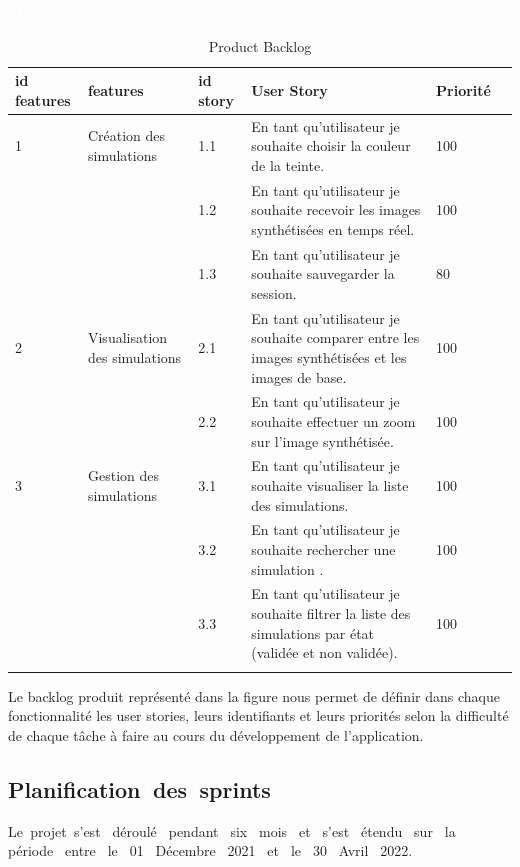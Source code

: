 \begin{center}
\textcolor{white}{J}\textcolor{white}{J}\textcolor{white}{J} \textcolor{white}{J} 

\begin{longtable}[!ht]{|m{1cm}|m{3cm}|m{1cm}|m{7cm}|m{1.5cm}|c|}
\hline
\textbf{id features} & \textbf{features} & \textbf{id story} & \textbf{User Story} & \textbf{Priorité}\\
\hline
1 & Création des simulations & 1.1 & En tant qu’utilisateur je souhaite choisir la couleur de la teinte. & 100\\
\cline{3-5}
&  & 1.2 & En tant qu’utilisateur je souhaite recevoir les images synthétisées en temps  réel. & 100\\
\cline{3-5}
&  & 1.3 & En tant qu’utilisateur je souhaite sauvegarder la session. & 80\\
\hline
2 & Visualisation des simulations & 2.1 & En tant qu’utilisateur je souhaite comparer entre les images synthétisées et les images de base. & 100\\
\cline{3-5}
&  & 2.2 & En tant qu’utilisateur je souhaite effectuer un zoom sur l’image synthétisée. & 100\\


\hline
3 & Gestion des simulations  & 3.1 & En tant qu’utilisateur je souhaite visualiser la liste des simulations. & 100\\
\cline{3-5}
&  & 3.2 & En tant qu’utilisateur je souhaite rechercher une simulation . & 100\\
\cline{3-5}
&  & 3.3 & En tant qu’utilisateur je souhaite filtrer la liste des simulations par état (validée et non validée). & 100\\

\hline
\caption{Product Backlog}
\label{tab:backlog}
\end{longtable}

\end{center}

Le backlog produit représenté dans la figure nous permet de définir dans chaque fonctionnalité les user stories, leurs identifiants et leurs priorités selon la difficulté de chaque tâche à faire au cours du développement de l’application.

\subsection{Planification\textcolor{white}{J}des\textcolor{white}{J}sprints}
Le\textcolor{white}{J}projet\textcolor{white}{J}s'est\textcolor{white}{J} déroulé\textcolor{white}{J} pendant\textcolor{white}{J} six\textcolor{white}{J} mois\textcolor{white}{J} et\textcolor{white}{J} s'est\textcolor{white}{J} étendu\textcolor{white}{J} sur\textcolor{white}{J} la\textcolor{white}{J} période\textcolor{white}{J} entre\textcolor{white}{J} le\textcolor{white}{J} 01\textcolor{white}{J} Décembre\textcolor{white}{J} 2021\textcolor{white}{J} et\textcolor{white}{J} le\textcolor{white}{J} 30\textcolor{white}{J} Avril\textcolor{white}{J} 2022.

